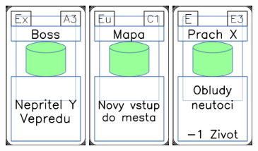 \documentclass[a4paper]{article}
\begin{document}
	\includegraphics[width=3.0cm]{img-4_2}
	\includegraphics[width=3.0cm]{img-4_40}
	\includegraphics[width=3.0cm]{img-4_52}
\end{document}
